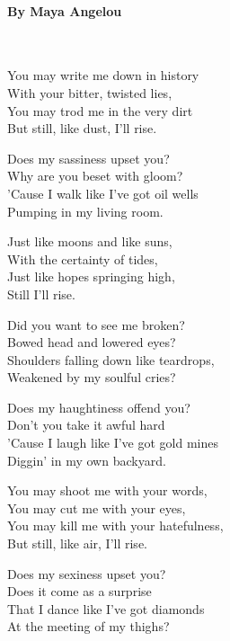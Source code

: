 \documentclass[11pt, letterpaper]{memoir}
\begin{document}
{	\paragraph{By Maya Angelou}~
	
	\vspace{1em}
	\begin{minipage}[t]{0.49\linewidth}
		
		You may write me down in history\\
		With your bitter, twisted lies,\\
		You may trod me in the very dirt\\
		But still, like dust, I'll rise.
		
		Does my sassiness upset you?\\
		Why are you beset with gloom?\\
		’Cause I walk like I've got oil wells\\
		Pumping in my living room.
		
		Just like moons and like suns,\\
		With the certainty of tides,\\
		Just like hopes springing high,\\
		Still I'll rise.
		
		Did you want to see me broken?\\
		Bowed head and lowered eyes?\\
		Shoulders falling down like teardrops,\\
		Weakened by my soulful cries?
		
		Does my haughtiness offend you?\\
		Don't you take it awful hard\\
		’Cause I laugh like I've got gold mines\\
		Diggin’ in my own backyard.
		
		You may shoot me with your words,\\
		You may cut me with your eyes,\\
		You may kill me with your hatefulness,\\
		But still, like air, I’ll rise.	
		
	\end{minipage}
	\begin{minipage}[t]{0.49\linewidth}
		
		Does my sexiness upset you?\\
		Does it come as a surprise\\
		That I dance like I've got diamonds\\
		At the meeting of my thighs?
		

\end{minipage}}
\end{document}
